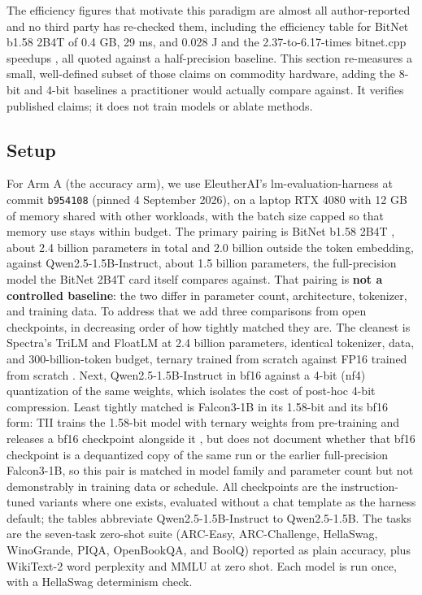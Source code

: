 \documentclass[11pt]{article}
\begin{document}
The efficiency figures that motivate this paradigm are almost all author-reported and no
third party has re-checked them, including the efficiency table for BitNet b1.58 2B4T of
0.4 GB, 29 ms, and 0.028 J \cite{web-bitnet2b4tCard} and the 2.37-to-6.17-times bitnet.cpp
speedups \cite{Wang2024-1bitAIInfra}, all quoted against a half-precision baseline. This
section re-measures a small, well-defined subset of those claims on commodity hardware,
adding the 8-bit and 4-bit baselines a practitioner would actually compare against. It
verifies published claims; it does not train models or ablate methods.

\subsection{Setup}

For Arm A (the accuracy arm), we use EleutherAI's lm-evaluation-harness at commit
\texttt{b954108} (pinned 4 September 2026), on a laptop RTX 4080 with 12 GB of memory shared
with other workloads, with the batch size capped so that memory use stays within budget.
The primary pairing is BitNet b1.58 2B4T \cite{Ma2025-BitNet2B4T}, about 2.4 billion
parameters in total and 2.0 billion outside the token embedding, against
Qwen2.5-1.5B-Instruct, about 1.5 billion parameters, the full-precision model the BitNet
2B4T card itself compares against. That pairing is \textbf{not a controlled baseline}: the two
differ in parameter count, architecture, tokenizer, and training data. To address that we
add three comparisons from open checkpoints, in decreasing order of how tightly matched
they are. The cleanest is Spectra's TriLM and FloatLM at 2.4 billion parameters,
identical tokenizer, data, and 300-billion-token budget, ternary trained from scratch
against FP16 trained from scratch \cite{Kaushal2024-Spectra}. Next, Qwen2.5-1.5B-Instruct in
bf16 against a 4-bit (nf4) quantization of the same weights, which isolates the cost of
post-hoc 4-bit compression. Least tightly matched is Falcon3-1B in its 1.58-bit and its
bf16 form: TII trains the 1.58-bit model with ternary weights from pre-training and
releases a bf16 checkpoint alongside it \cite{web-falconEdge}, but does not document whether
that bf16 checkpoint is a dequantized copy of the same run or the earlier full-precision
Falcon3-1B, so this pair is matched in model family and parameter count but not
demonstrably in training data or schedule. All checkpoints are the
instruction-tuned variants where one exists, evaluated without a chat template as the
harness default; the tables abbreviate Qwen2.5-1.5B-Instruct to Qwen2.5-1.5B. The tasks
are the seven-task zero-shot suite (ARC-Easy, ARC-Challenge, HellaSwag, WinoGrande, PIQA,
OpenBookQA, and BoolQ) reported as plain accuracy, plus WikiText-2 word perplexity and
MMLU at zero shot. Each model is run once, with a HellaSwag determinism check.
\end{document}
